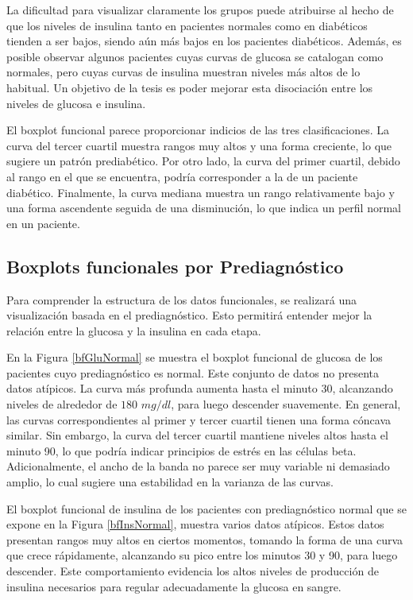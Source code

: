 La dificultad para visualizar claramente los grupos puede atribuirse al hecho de que los niveles de insulina tanto en pacientes normales como en diabéticos tienden a ser bajos, siendo aún más bajos en los pacientes diabéticos. Además, es posible observar algunos pacientes cuyas curvas de glucosa se catalogan como normales, pero cuyas curvas de insulina muestran niveles más altos de lo habitual. Un objetivo de la tesis es poder mejorar esta disociación entre los niveles de glucosa e insulina.


El boxplot funcional parece proporcionar indicios de las tres clasificaciones. La curva del tercer cuartil muestra rangos muy altos y una forma creciente, lo que sugiere un patrón prediabético. Por otro lado, la curva del primer cuartil, debido al rango en el que se encuentra, podría corresponder a la de un paciente diabético. Finalmente, la curva mediana muestra un rango relativamente bajo y una forma ascendente seguida de una disminución, lo que indica un perfil normal en un paciente.

\subsection{Boxplots funcionales por Prediagnóstico}

Para comprender la estructura de los datos funcionales, se realizará una visualización basada en el prediagnóstico. Esto permitirá entender mejor la relación entre la glucosa y la insulina en cada etapa.

En la Figura \ref{bfGluNormal} se muestra el boxplot funcional de glucosa de los pacientes cuyo prediagnóstico es normal. Este conjunto de datos no presenta datos atípicos. La curva más profunda aumenta hasta el minuto 30, alcanzando niveles de alrededor de $180$ $mg/dl$, para luego descender suavemente. En general, las curvas correspondientes al primer y tercer cuartil tienen una forma cóncava similar. Sin embargo, la curva del tercer cuartil mantiene niveles altos hasta el minuto 90, lo que podría indicar principios de estrés en las células beta. Adicionalmente, el ancho de la banda no parece ser muy variable ni demasiado amplio, lo cual sugiere una estabilidad en la varianza de las curvas.

El boxplot funcional de insulina de los pacientes con prediagnóstico normal que se expone en la Figura \ref{bfInsNormal}, muestra varios datos atípicos. Estos datos presentan rangos muy altos en ciertos momentos, tomando la forma de una curva que crece rápidamente, alcanzando su pico entre los minutos 30 y 90, para luego descender. Este comportamiento evidencia los altos niveles de producción de insulina necesarios para regular adecuadamente la glucosa en sangre.


